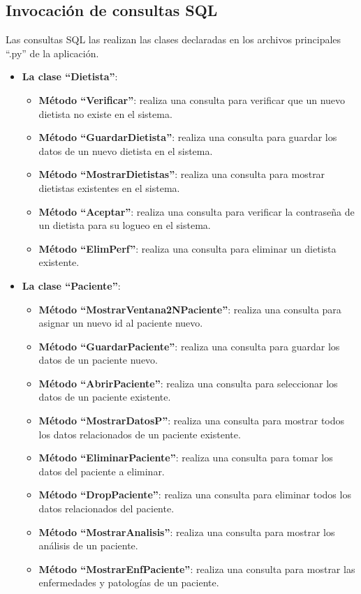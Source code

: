 \subsection{Invocación de consultas SQL}
Las consultas SQL las realizan las clases declaradas en los archivos  principales ``.py'' de la aplicación.\\
\begin{itemize}
\item \textbf{La clase ``Dietista''}:
\begin{itemize}
\item \textbf{Método ``Verificar''}: realiza una consulta para verificar que un nuevo dietista no existe en el sistema.
\item \textbf{Método ``GuardarDietista''}: realiza una consulta para guardar los datos de un nuevo dietista en el sistema.
\item \textbf{Método ``MostrarDietistas''}: realiza una consulta para mostrar dietistas existentes en el sistema.
\item \textbf{Método ``Aceptar''}: realiza una consulta para verificar la contraseña de un dietista para su logueo en el sistema.
\item \textbf{Método ``ElimPerf''}: realiza una consulta para eliminar un dietista existente.
\end{itemize}
\item \textbf{La clase ``Paciente''}:
\begin{itemize}
\item \textbf{Método ``MostrarVentana2NPaciente''}: realiza una consulta para asignar un nuevo id al paciente nuevo.
\item \textbf{Método ``GuardarPaciente''}: realiza una consulta para guardar los datos de un paciente nuevo.
\item \textbf{Método ``AbrirPaciente''}: realiza una consulta para seleccionar los datos de un paciente existente.
\item \textbf{Método ``MostrarDatosP''}: realiza una consulta para mostrar todos los datos relacionados de un paciente existente.
\item \textbf{Método ``EliminarPaciente''}: realiza una consulta para tomar los datos del paciente a eliminar.
\item \textbf{Método ``DropPaciente''}: realiza una consulta para eliminar todos los datos relacionados del paciente.
\item \textbf{Método ``MostrarAnalisis''}: realiza una consulta para mostrar los análisis de un paciente.
\item \textbf{Método ``MostrarEnfPaciente''}: realiza una consulta para mostrar las enfermedades y patologías de un paciente.

\end{itemize}
\end{itemize}
